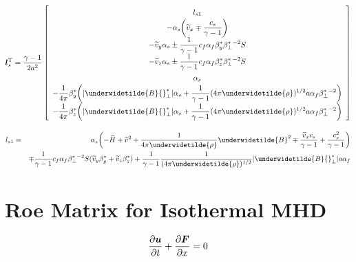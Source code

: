 \begin{center}
$\renewcommand{\arraystretch}{1.5}
\displaystyle
\mbox{\boldmath $l$}_{s}^{\rm T} =
\frac{\gamma -1}{2 a^2}
\left[
\begin{array}{c}
l_{s1} \\
\displaystyle
- \alpha_{s} \biggl( \widetilde{v}_{x} \mp \frac{c_{s}}{\gamma -1} \biggr) \\
\displaystyle
- \widetilde{v}_{y} \alpha_{s} \pm \frac1{\gamma -1} c_{f} \alpha_{f}
\beta^{\ast}_{y} \beta^{\ast}_{\bot} {}^{-2} S \\
\displaystyle
- \widetilde{v}_{z} \alpha_{s} \pm \frac1{\gamma -1} c_{f} \alpha_{f}
\beta^{\ast}_{z} \beta^{\ast}_{\bot} {}^{-2} S \\
\alpha_{s} \\
\displaystyle
- \frac1{4 \pi} \beta^{\ast}_{y} \biggl( 
| \underwidetilde{B}{}^{\ast}_{\bot} | \alpha_{s} + \frac1{\gamma -1} 
(4 \pi \underwidetilde{\rho})^{1/2} a \alpha_{f} 
\beta^{\ast}_{\bot} {}^{-2} \biggr)\\
\displaystyle
- \frac1{4 \pi} \beta^{\ast}_{z} \biggl( 
| \underwidetilde{B}{}^{\ast}_{\bot} | \alpha_{s} + \frac1{\gamma -1} 
(4 \pi \underwidetilde{\rho})^{1/2} a \alpha_{f} 
\beta^{\ast}_{\bot} {}^{-2} \biggr)\\
\end{array}
\right]$ 
\end{center}

\begin{center}
\begin{eqnarray}
\displaystyle
l_{s1} &=& \alpha_{s} \biggl( - \widetilde{H} + \widetilde{v}^2 + 
\frac1{4 \pi \underwidetilde{\rho}} \underwidetilde{B}^2
\mp \frac{\widetilde{v}_{x} c_{s}}{\gamma -1} + \frac{c_{s}^2}{\gamma -1} 
\biggr)  \nonumber \\
&& \mp \frac1{\gamma -1} c_{f} \alpha_{f} \beta^{\ast}_{\bot} {}^{-2} S 
(\widetilde{v}_{y} \beta_{y}^{\ast} + \widetilde{v}_{z} \beta_{z}^{\ast})
+ \frac1{\gamma -1} \frac1{(4 \pi \underwidetilde{\rho})^{1/2}} 
| \underwidetilde{B} {}^{\ast}_{\bot} | a \alpha_{f} \nonumber
\end{eqnarray}
\end{center}

\newpage

\section{Roe Matrix for Isothermal MHD}

\begin{equation}
\frac{\partial \mbox{\boldmath $u$}}{\partial t} +
\frac{\partial \mbox{\boldmath $F$}}{\partial x} = 0
\end{equation}

